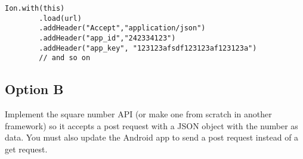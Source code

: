 \begin{lstlisting}[style=A_Java]
Ion.with(this)
        .load(url)
        .addHeader("Accept","application/json")
        .addHeader("app_id","242334123")
        .addHeader("app_key", "123123afsdf123123af123123a")
        // and so on
\end{lstlisting}

\subsection{Option B}
Implement the square number API (or make one from scratch in another framework) so it accepts a post request with a JSON object with the number as data. You must also update the Android app to send a post request instead of a get request.

